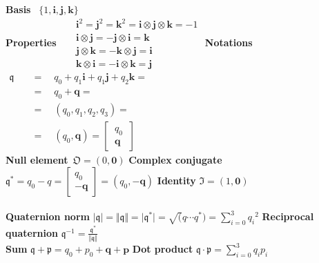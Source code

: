 \documentclass[a4paper, 12pt]{article}
\begin{document}
\section*{\color{black}{Quaternions}}
{\small{



\textbf{Basis} \ $\{1, \mathbf{i, j, k}\}$\\
{
\centering
\textbf{Properties} \ 
$\begin{aligned}
    &\mathbf{i}^2=\mathbf{j}^2=\mathbf{k}^2=\mathbf{i\otimes j \otimes k}=-1\\
    &\mathbf{i}\otimes\mathbf{j}=-\mathbf{j}\otimes\mathbf{i}=\mathbf{k}\\
    &\mathbf{j}\otimes\mathbf{k}=-\mathbf{k}\otimes\mathbf{j}=\mathbf{i}\\
    &\mathbf{k}\otimes\mathbf{i}=-\mathbf{i}\otimes\mathbf{k}=\mathbf{j}
\end{aligned}$
\textbf{Notations} \ 
$\begin{aligned}
    \mathfrak{q} \quad &= \quad q_0+q_1\mathbf{i}+q_1\mathbf{j}+q_2\mathbf{k}=\\
                 &= \quad q_0+\mathbf{q}=\\
                 &=\quad (q_0, q_1, q_2, q_3)=\\
                 &=\quad  (q_0, \mathbf{q})=\begin{bmatrix}
                    \ q_0 \ \\\ \mathbf{q} \
                 \end{bmatrix}
\end{aligned}$
}\\
\textbf{Null element}\ $\mathfrak{O} = (0, \mathbf{0})$ \quad
\textbf{Complex conjugate} $\mathfrak{q}^*=q_0-q=\begin{bmatrix}
    q_0\\-\mathbf{q}
\end{bmatrix}=(q_0, -\mathbf{q})$
\textbf{Identity} \quad
$ \mathfrak{I} = (1, \mathbf{0})$\\
\noindent\\
\textbf{Quaternion norm}
$\vert \mathfrak{q} \vert = \Vert \mathfrak{q} \Vert = \vert \mathfrak{q}^* \vert=\sqrt(q \cdots q^* )=
\sum_{i=0}^3 {q_i}^2$ \quad
\textbf{Reciprocal quaternion}
$ \mathfrak{q}^{-1}=\frac{\mathfrak{q}^*}{\Vert \mathfrak{q} \Vert}$\\

\noindent
\textbf{Sum}
$ \mathfrak{q}+\mathfrak{p}=q_0+p_0+\mathbf{q}+\mathbf{p}$
\quad \quad
\textbf{Dot product}
$\mathfrak{q} \cdot \mathfrak{p} = 
\sum_{i=0}^3 {q_i p_i}$\\

}}
\end{document}
